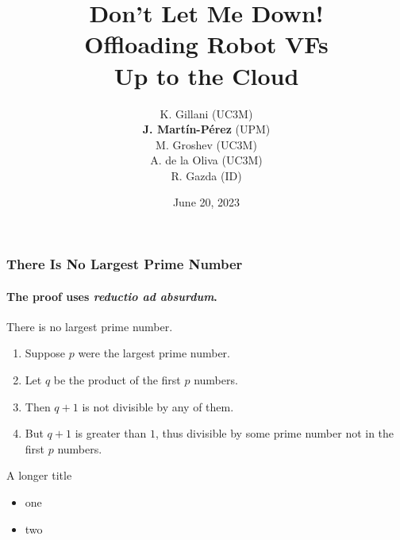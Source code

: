 \documentclass[aspectratio=169]{beamer}
\title{Don't Let Me Down!\\Offloading Robot VFs \\Up to the Cloud\vspace{1em}}
\date{June 20, 2023}
\author{K. Gillani (UC3M)\\
\textbf{J. Martín-Pérez} (UPM)\\
M. Groshev (UC3M)\\
A. de la Oliva (UC3M)\\
R. Gazda (ID)}
\begin{document}
\begin{frame}
\titlepage
\end{frame}

\setcounter{framenumber}{0}


\begin{frame}
\frametitle{There Is No Largest Prime Number}
\framesubtitle{The proof uses \textit{reductio ad absurdum}.}
\begin{theorem}
There is no largest prime number. \end{theorem}
\begin{enumerate}
\item<1-| alert@1> Suppose $p$ were the largest prime number.
\item<2-> Let $q$ be the product of the first $p$ numbers.
\item<3-> Then $q+1$ is not divisible by any of them.
\item<1-> But $q + 1$ is greater than $1$, thus divisible by some prime
number not in the first $p$ numbers.

\end{enumerate}
\end{frame}



\begin{frame}{A longer title}
\begin{itemize}
\item one
\item two
\end{itemize}
\end{frame}
\end{document}
